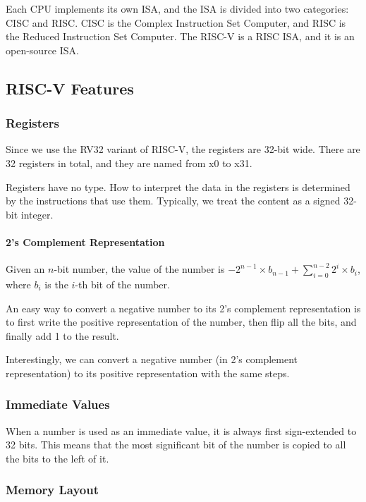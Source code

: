 \documentclass[a4paper,12pt]{article}
\begin{document}
Each CPU implements its own ISA, and the ISA is divided into two categories: CISC and RISC. CISC is the Complex Instruction Set Computer, and RISC is the Reduced Instruction Set Computer. The RISC-V is a RISC ISA, and it is an open-source ISA.

\subsection{RISC-V Features}

\subsubsection{Registers}

Since we use the RV32 variant of RISC-V, the registers are 32-bit wide. There are 32 registers in total, and they are named from x0 to x31. 

Registers have no type. How to interpret the data in the registers is determined by the instructions that use them. Typically, we treat the content as a signed 32-bit integer.

\paragraph{2's Complement Representation} Given an $n$-bit number, the value of the number is $-2^{n-1} \times b_{n-1} + \sum_{i=0}^{n-2} 2^i \times b_i$, where $b_i$ is the $i$-th bit of the number.

\begin{tipsbox}
	An easy way to convert a negative number to its 2's complement representation is to first write the positive representation of the number, then flip all the bits, and finally add 1 to the result. 

	Interestingly, we can convert a negative number (in 2's complement representation) to its positive representation with the same steps.
\end{tipsbox}

\subsubsection{Immediate Values}

When a number is used as an immediate value, it is always first sign-extended to 32 bits. This means that the most significant bit of the number is copied to all the bits to the left of it.

\subsubsection{Memory Layout}
\end{document}
